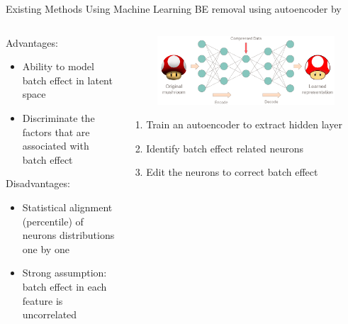 \documentclass{beamer}
\begin{document}
\begin{frame}{Existing Methods Using Machine Learning}
  BE removal using autoencoder by \citeauthor*{Amodio2018} \citeyear{Amodio2018}
  \vspace{0.5cm}
  \begin{columns}
    \begin{column}[t]{.48\textwidth}
      Advantages:
      \begin{itemize}
        \item Ability to model batch effect in latent space
        \item Discriminate  the factors that are associated with batch effect
      \end{itemize}
      Disadvantages:
      \begin{itemize}
        \item Statistical alignment (percentile) of neurons distributions  one
          by one
        \item Strong assumption: batch effect in each feature is uncorrelated
      \end{itemize}
    \end{column}
    \begin{column}[t]{.48\textwidth}
      \vspace{-1cm}
      \begin{figure}[ht]
        \centering
        \includegraphics[width=1.0\textwidth,height=0.5\textheight,keepaspectratio]{figures/mushroom_encoder.png}
        \caption*{\vspace{0.3cm}\label{fig:be-autoencoder}}
      \end{figure}
      \vspace{-1cm}
      \begin{enumerate}
        \item Train an autoencoder to extract hidden  layer
        \item Identify batch effect related neurons
        \item Edit the neurons to correct batch effect
      \end{enumerate}
    \end{column}
  \end{columns}
\end{frame}
\end{document}
